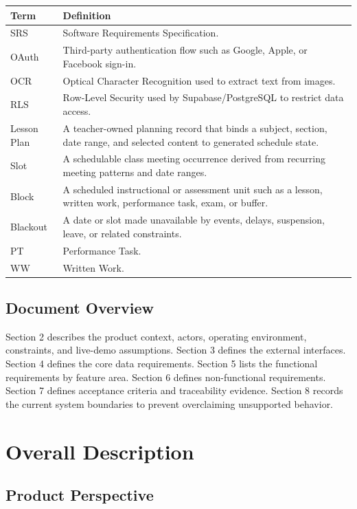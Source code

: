 \documentclass[12pt]{article}
\begin{document}
\begin{longtable}{|L{3.5cm}|L{10.2cm}|}
\hline
\textbf{Term} & \textbf{Definition} \\
\hline
SRS & Software Requirements Specification. \\
\hline
OAuth & Third-party authentication flow such as Google, Apple, or Facebook sign-in. \\
\hline
OCR & Optical Character Recognition used to extract text from images. \\
\hline
RLS & Row-Level Security used by Supabase/PostgreSQL to restrict data access. \\
\hline
Lesson Plan & A teacher-owned planning record that binds a subject, section, date range, and selected content to generated schedule state. \\
\hline
Slot & A schedulable class meeting occurrence derived from recurring meeting patterns and date ranges. \\
\hline
Block & A scheduled instructional or assessment unit such as a lesson, written work, performance task, exam, or buffer. \\
\hline
Blackout & A date or slot made unavailable by events, delays, suspension, leave, or related constraints. \\
\hline
PT & Performance Task. \\
\hline
WW & Written Work. \\
\hline
\end{longtable}

\subsection{Document Overview}

Section 2 describes the product context, actors, operating environment,
constraints, and live-demo assumptions. Section 3 defines the external
interfaces. Section 4 defines the core data requirements. Section 5 lists the
functional requirements by feature area. Section 6 defines non-functional
requirements. Section 7 defines acceptance criteria and traceability evidence.
Section 8 records the current system boundaries to prevent overclaiming
unsupported behavior.

\section{Overall Description}

\subsection{Product Perspective}
\end{document}
